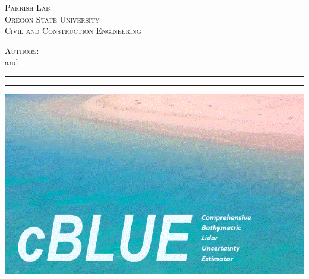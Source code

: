 %
\noindent %
%
\begin{minipage}{.40\textwidth}
    \textsc{Parrish Lab} \\ 
    \small\textsc{Oregon State University}\\%
    \small\textsc{Civil and Construction Engineering}
\end{minipage}%
\hfill	
\begin{minipage}{0.60\textwidth}%
    \raggedleft%
    {\Large \textsc{\coursetitle { } \coursenumber}\par}
    \doublerule %
    \textsc{Authors}: \instructor \\ and \instructorsecond\\
\end{minipage}%
\vspace{1.0cm}
{
    \hrule\vspace{.2cm}
    \centering
    { 
        \huge \color{darkestblue}{\doctitle}{ }\par}
    \vspace{.3cm}    
}
{
    \hrule\vspace{.3cm}

}    

\centering
\includegraphics[width=\linewidth]{figs/cBLUE_splash.png}
\raggedleft
\vspace{0.3cm}
